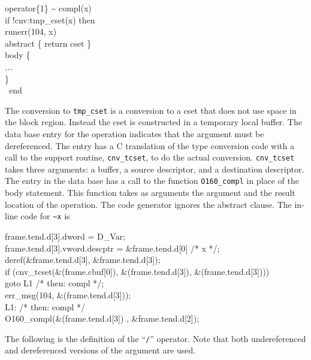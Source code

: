 \goodbreak
\begin{iconcode}
\>operator\{1\} \textasciitilde{} compl(x)\\
\>\>if !cnv:tmp\_cset(x) then\\
\>\>\>runerr(104, x)\\
\>\>abstract \{ return cset \}\\
\>\>body \{\\
\>\>\textit{...}\\
\>\>\}\\
\>\ end\\
\end{iconcode}

\noindent
The conversion to \texttt{tmp\_cset} is a conversion to a cset that
does not use space in the block region. Instead the cset is
constructed in a temporary local buffer. The data base entry for the
operation indicates that the argument must be dereferenced. The entry
has a C translation of the type conversion code with a call to the
support routine, \texttt{cnv\_tcset}, to do the actual
conversion. \texttt{cnv\_tcset} takes three arguments: a buffer, a
source descriptor, and a destination descriptor. The entry in the data
base has a call to the function \texttt{O160\_compl} in place of the
body statement. This function takes as arguments the argument and the
result location of the operation. The code generator ignores the
abstract clause. The in-line code for \texttt{\textasciitilde{}x} is

\goodbreak
\begin{iconcode}
\>\>frame.tend.d[3].dword = D\_Var;\\
\>\>frame.tend.d[3].vword.descptr = \&frame.tend.d[0] /* x */;\\
\>\>deref(\&frame.tend.d[3], \&frame.tend.d[3]);\\
\>\>if (cnv\_tcset(\&(frame.cbuf[0]), \&(frame.tend.d[3]), \&(frame.tend.d[3])))\\
\>\>\>goto L1 /* then: compl */;\\
\>\>err\_msg(104, \&(frame.tend.d[3]));\\
\>L1: /* then: compl */\\
\>\>O160\_compl(\&(frame.tend.d[3]) , \&frame.tend.d[2]);\\
\end{iconcode}


The following is the definition of the ``\texttt{/}'' operator. Note
that both undereferenced and dereferenced versions of the argument are
used.

